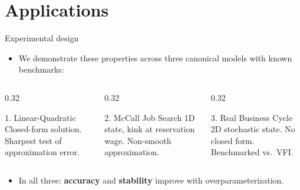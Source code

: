 \documentclass[aspectratio=169,10pt]{beamer}
\newcommand{\emphcolor}[1]{\textbf{\textcolor{emphcolorval}{#1}}}
\begin{document}
\section{\textcolor{KahouBlack}{Applications}}

\begin{frame}{Experimental design}
	\begin{itemize}
		\item We demonstrate these properties across three canonical models with known benchmarks:
	\end{itemize}
	\vspace{0.1in}
	\begin{columns}
		\begin{column}{0.32\textwidth}
			\begin{block}{1. Linear-Quadratic}
				Closed-form solution. Sharpest test of approximation error.
			\end{block}
		\end{column}
		\begin{column}{0.32\textwidth}
			\begin{block}{2. McCall Job Search}
				1D state, kink at reservation wage. Non-smooth approximation.
			\end{block}
		\end{column}
		\begin{column}{0.32\textwidth}
			\begin{block}{3. Real Business Cycle}
				2D stochastic state. No closed form. Benchmarked vs.\ VFI.
			\end{block}
		\end{column}
	\end{columns}
	\vspace{0.15in}
	\begin{itemize}
		\item In all three: \emphcolor{accuracy} and \emphcolor{stability} improve with overparameterization.
	\end{itemize}
\end{frame}
\end{document}

